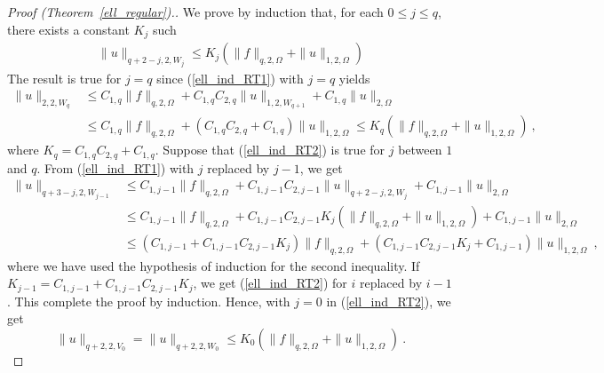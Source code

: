 \begin{proof}[Proof (Theorem~\ref{ell_regular}).]
We prove by induction that, for each $0\leq j \leq q$, there
exists a constant $K_j$ such
\begin{align} \label{ell_ind_RT2}
\|u\|_{q+2-j,2,W_j} \leq K_j \left( \|f\|_{q,2,\Omega} + \|u\|_{1,2,\Omega} \right)
\end{align}
The result is true for $j=q$ since (\ref{ell_ind_RT1}) with $j=q$ yields
\begin{align*}
\| u \|_{2,2,W_q} &\leq C_{1,q} \|f\|_{q,2,\Omega}
+ C_{1,q} C_{2,q} \|u\|_{1,2,W_{q+1}} + C_{1,q} \| u \|_{2,\Omega} \\
&\leq C_{1,q} \|f\|_{q,2,\Omega} + \left( C_{1,q} C_{2,q} + C_{1,q}\right)
\| u \|_{1,2,\Omega}
\leq K_q \left( \|f\|_{q,2,\Omega} + \|u\|_{1,2,\Omega} \right) \ ,
\end{align*}
where $K_q = C_{1,q} C_{2,q} + C_{1,q}$.  Suppose that
(\ref{ell_ind_RT2}) is true for $j$ between $1$ and $q$.  From
(\ref{ell_ind_RT1}) with $j$ replaced by $j-1$, we get
\begin{align*}
\| u \|_{q+3-j,2,W_{j-1}} &\leq C_{1,j-1} \|f\|_{q,2,\Omega}
+ C_{1,j-1} C_{2,j-1} \|u\|_{q+2-j,2,W_j} + C_{1,j-1} \| u \|_{2,\Omega} \\
&\leq C_{1,j-1} \|f\|_{q,2,\Omega}
+ C_{1,j-1} C_{2,j-1} K_j \left( \|f\|_{q,2,\Omega} + \|u\|_{1,2,\Omega} \right)
+ C_{1,j-1} \| u \|_{2,\Omega} \\
&\leq \left( C_{1,j-1} + C_{1,j-1} C_{2,j-1} K_j \right) \|f\|_{q,2,\Omega}
+ \left( C_{1,j-1} C_{2,j-1} K_j + C_{1,j-1} \right)\| u \|_{1,2,\Omega} \ ,
\end{align*}
where we have used the hypothesis of induction for the second
inequality.  If
$\displaystyle K_{j-1} = C_{1,j-1} + C_{1,j-1} C_{2,j-1} K_j$,
we get (\ref{ell_ind_RT2}) for $i$ replaced by $i-1$.  This complete
the proof by induction.
Hence, with $j=0$ in (\ref{ell_ind_RT2}), we get
\begin{equation} \label{ell_ind_RT3}
\|u\|_{q+2,2,V_0} = \|u\|_{q+2,2,W_0} \leq K_0
\left( \|f\|_{q,2,\Omega} + \|u\|_{1,2,\Omega} \right) \ .
\end{equation}


\end{proof}
